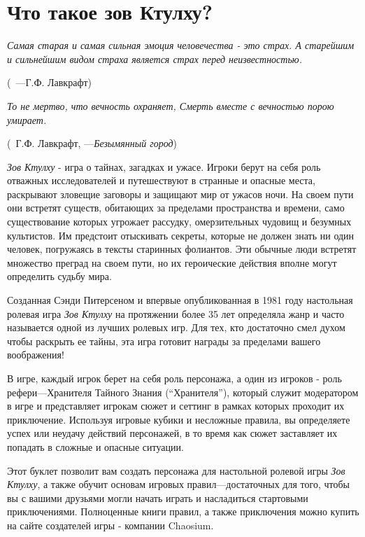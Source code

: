 \documentclass[letterpaper,twocolumn,openany, twoside, 8pt, usenames]{cocbook}
\renewenvironment{quote}{%
   \list{}{%
     \leftmargin0.0cm   %
     \rightmargin\leftmargin
   }
   \item\relax
}
{\endlist}
\let\oldquote\quote
\let\endoldquote\endquote
\renewenvironment{quote}[2][]
  {\if\relax\detokenize{#1}\relax
     \def\quoteauthor{~#2}%
   \fi
   \oldquote}
  {\par\nobreak\smallskip\hfill(\quoteauthor)%
   \endoldquote\addvspace{\bigskipamount}}
\begin{document}
\scriptsize

\section*{\nohyphens{Что такое зов Ктулху?}}
\begin{quote}{---Г.Ф. Лавкрафт}
{\it Самая старая и самая сильная эмоция человечества - это страх. А старейшим и сильнейшим видом страха является страх перед неизвестностью.}
\end{quote}

\begin{quote}{Г.Ф. Лавкрафт, ---{\it Безымянный город}}
{\it То не мертво, что вечность охраняет, Смерть вместе с вечностью порою умирает.}
\end{quote}

{\it Зов Ктулху} - игра о тайнах, загадках и ужасе. Игроки берут на себя роль отважных исследователей и путешествуют в странные и опасные места, раскрывают зловещие заговоры и защищают мир от ужасов ночи. На своем пути они встретят существ, обитающих за пределами пространства и времени, само существование которых угрожает рассудку, омерзительных чудовищ и безумных культистов. Им предстоит отыскивать секреты, которые не должен знать ни один человек, погружаясь в тексты старинных фолиантов. Эти обычные люди встретят множество преград на своем пути, но их героические действия вполне могут определить судьбу мира.

Созданная Сэнди Питерсеном и впервые опубликованная в 1981 году настольная ролевая игра {\it Зов Ктулху} на протяжении более 35 лет определяла жанр и часто называется одной из лучших ролевых игр. Для тех, кто достаточно смел духом чтобы раскрыть ее тайны, эта игра готовит награды за пределами вашего воображения!

В игре, каждый игрок берет на себя роль персонажа, а один из игроков - роль рефери---Хранителя Тайного Знания (``Хранителя''), который служит модератором в игре и представляет игрокам сюжет и сеттинг в рамках которых проходит их приключение. Используя игровые кубики и несложные правила, вы определяете успех или неудачу действий персонажей, в то время как сюжет заставляет их попадать в сложные и опасные ситуации.

Этот буклет позволит вам создать персонажа для настольной ролевой игры {\it Зов Ктулху}, а также обучит основам игровых правил---достаточных для того, чтобы вы с вашими друзьями могли начать играть и насладиться стартовыми приключениями. Полноценные книги правил, а также приключения можно купить на сайте создателей игры - компании Chaosium.
\end{document}
